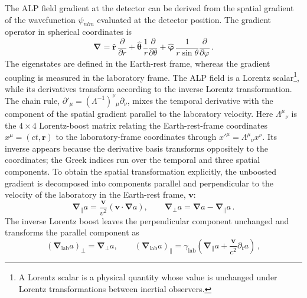 The ALP field gradient at the detector can be derived from the spatial gradient of the wavefunction $\psi_{nlm}$ evaluated at the detector position.
The gradient operator in spherical coordinates is
\begin{equation}
    \boldsymbol{\nabla} = \hat{\boldsymbol{r}}\,\frac{\partial}{\partial r} + \hat{\boldsymbol{\theta}}\,\frac{1}{r}\frac{\partial}{\partial \theta} + \hat{\boldsymbol{\varphi}}\,\frac{1}{r\sin\theta}\frac{\partial}{\partial \varphi}
    \,.\label{eq:gradient_spherical}
\end{equation}
The eigenstates are defined in the Earth-rest frame, whereas the gradient coupling is measured in the laboratory frame.
The ALP field is a Lorentz scalar\footnote{A Lorentz scalar is a physical quantity whose value is unchanged under Lorentz transformations between inertial observers.}, while its derivatives transform according to the inverse Lorentz transformation.
The chain rule, $\partial'_\mu=(\Lambda^{-1})^\nu{}_\mu\partial_\nu$, mixes the temporal derivative with the component of the spatial gradient parallel to the laboratory velocity.
Here $\Lambda^\mu{}_\nu$ is the $4\times4$ Lorentz-boost matrix relating the Earth-rest-frame coordinates $x^\mu=(ct,\boldsymbol{r})$ to the laboratory-frame coordinates through $x'^\mu=\Lambda^\mu{}_\nu x^\nu$.
Its inverse appears because the derivative basis transforms oppositely to the coordinates; the Greek indices run over the temporal and three spatial components.
To obtain the spatial transformation explicitly, the unboosted gradient is decomposed into components parallel and perpendicular to the velocity of the laboratory in the Earth-rest frame, $\boldsymbol{v}$:
\begin{equation}
    \boldsymbol{\nabla}_{\parallel}a
    =
    \frac{\boldsymbol{v}}{v^2}
    \left(\boldsymbol{v}\cdot\boldsymbol{\nabla}a\right),
    \qquad
    \boldsymbol{\nabla}_{\perp}a
    =
    \boldsymbol{\nabla}a-\boldsymbol{\nabla}_{\parallel}a
    \,.
\end{equation}
The inverse Lorentz boost leaves the perpendicular component unchanged and transforms the parallel component as
\begin{equation}
    \left(\boldsymbol{\nabla}_\mathrm{lab}a\right)_{\perp}
    =
    \boldsymbol{\nabla}_{\perp}a,
    \qquad
    \left(\boldsymbol{\nabla}_\mathrm{lab}a\right)_{\parallel}
    =
    \gamma_\mathrm{lab}
    \left(
    \boldsymbol{\nabla}_{\parallel}a
    +
    \frac{\boldsymbol{v}}{c^2}\partial_t a
    \right)
    \,,
\end{equation}
